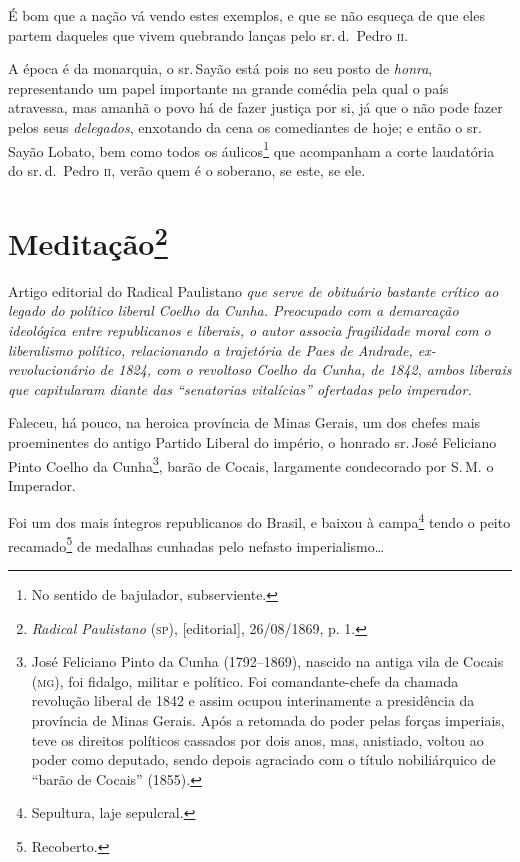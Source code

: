 É bom que a nação vá vendo estes exemplos, e que se não esqueça de que
eles partem daqueles que vivem quebrando lanças pelo sr.\,d.~Pedro \textsc{ii}.

A época é da monarquia, o sr.\,Sayão está pois no seu posto de
\emph{honra}, representando um papel importante na grande comédia pela
qual o país atravessa, mas amanhã o povo há de fazer justiça por si, já
que o não pode fazer pelos seus \emph{delegados}, enxotando da cena os
comediantes de hoje; e então o sr.\,Sayão Lobato, bem como todos os
áulicos\footnote{No sentido de bajulador, subserviente.} que
acompanham a corte laudatória do sr.\,d.~Pedro \textsc{ii}, verão quem é o
soberano, se este, se ele.

\chapter{Meditação\footnote{\emph{Radical Paulistano} (\textsc{sp}),
  {[}editorial{]}, 26/08/1869, p. 1.}}

\begin{didascalia}
Artigo editorial do Radical Paulistano \emph{que serve de obituário
bastante crítico ao legado do político liberal Coelho da Cunha.
Preocupado com a demarcação ideológica entre republicanos e liberais, o
autor associa fragilidade moral com o liberalismo político, relacionando
a trajetória de Paes de Andrade, ex-revolucionário de 1824, com o
revoltoso Coelho da Cunha, de 1842, ambos liberais que capitularam
diante das ``senatorias vitalícias'' ofertadas pelo imperador.}
\end{didascalia}



Faleceu, há pouco, na heroica província de Minas Gerais, um dos chefes
mais proeminentes do antigo Partido Liberal do império, o honrado sr.\,José Feliciano Pinto Coelho da Cunha\footnote{José Feliciano Pinto da
  Cunha (1792--1869), nascido na antiga vila de Cocais (\textsc{mg}), foi fidalgo,
  militar e político. Foi comandante-chefe da chamada revolução liberal
  de 1842 e assim ocupou interinamente a presidência da província de
  Minas Gerais. Após a retomada do poder pelas forças imperiais, teve os
  direitos políticos cassados por dois anos, mas, anistiado, voltou ao
  poder como deputado, sendo depois agraciado com o título nobiliárquico
  de ``barão de Cocais'' (1855).}, barão de Cocais, largamente condecorado
por S.\,M. o Imperador.

Foi um dos mais íntegros republicanos do Brasil, e baixou à
campa\footnote{Sepultura, laje sepulcral.} tendo o peito
recamado\footnote{Recoberto.} de medalhas cunhadas pelo nefasto
imperialismo\ldots{}

